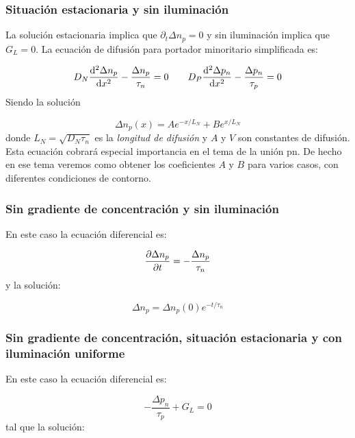 \subsubsection{Situación estacionaria y sin iluminación} \label{Subsec:02-04-02}

La solución estacionaria implica que $\partial_t \Delta n_p=0$ y sin iluminación implica que $G_L=0$. La ecuación de difusión para portador minoritario simplificada es:

\begin{equation}
	D_N \frac{\mathrm{d} ^2 \Delta n_p}{\mathrm{d}  x^2} - \frac{\Delta n_p}{\tau_n} = 0 \qquad
	D_P \frac{\mathrm{d} ^2 \Delta p_n}{\mathrm{d}  x^2} - \frac{\Delta p_n}{\tau_p} = 0
\end{equation}
Siendo la solución

\begin{equation}
	\Delta n_p (x) = A e^{-x/L_N} + B e^{x/L_N}
\end{equation}
donde $L_N=\sqrt{D_N \tau_n}$ es la \textit{longitud de difusión} y $A$ y $V$ son constantes de difusión. Esta ecuación cobrará especial importancia en el tema de la unión pn. De hecho en ese tema veremos como obtener los coeficientes $A$ y $B$ para varios casos, con diferentes condiciones de contorno. 

\subsubsection{Sin gradiente de concentración y sin iluminación}

En este caso la ecuación diferencial es: 

\begin{equation}
	\frac{\partial \Delta n_p}{\partial t} = - \frac{\Delta n_p}{\tau_n}
\end{equation}
y la solución: 

\begin{equation}
	\Delta n_p = \Delta n_p (0) e^{-t/\tau_n}
\end{equation}

\subsubsection{Sin gradiente de concentración, situación estacionaria y con iluminación uniforme}

En este caso la ecuación diferencial es: 

\begin{equation}
	- \frac{\Delta p_n}{\tau_p} + G_L = 0
\end{equation}
tal que la solución:

